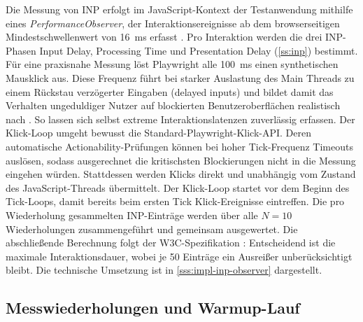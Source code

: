 Die Messung von INP erfolgt im JavaScript-Kontext der Testanwendung mithilfe eines \textit{PerformanceObserver}, der Interaktionsereignisse ab dem browserseitigen Mindestschwellenwert von \qty{16}{ms} erfasst \cite{mocny-event-timing-2026}. Pro Interaktion werden die drei INP-Phasen Input Delay, Processing Time und Presentation Delay (\cref{ss:inp}) bestimmt. Für eine praxisnahe Messung löst Playwright alle \qty{100}{ms} einen synthetischen Mausklick aus. Diese Frequenz führt bei starker Auslastung des Main Threads zu einem Rückstau verzögerter Eingaben (delayed inputs) und bildet damit das Verhalten ungeduldiger Nutzer auf blockierten Benutzeroberflächen realistisch nach \cite{web.dev_inp_2025, mdn_mthread_2025}. So lassen sich selbst extreme Interaktionslatenzen zuverlässig erfassen. Der Klick-Loop umgeht bewusst die Standard-Playwright-Klick-API. Deren automatische Actionability-Prüfungen \cite{playwright-autowaiting} können bei hoher Tick-Frequenz Timeouts auslösen, sodass ausgerechnet die kritischsten Blockierungen nicht in die Messung eingehen würden. Stattdessen werden Klicks direkt und unabhängig vom Zustand des JavaScript-Threads übermittelt. Der Klick-Loop startet vor dem Beginn des Tick-Loops, damit bereits beim ersten Tick Klick-Ereignisse eintreffen. Die pro Wiederholung gesammelten INP-Einträge werden über alle $N = 10$ Wiederholungen zusammengeführt und gemeinsam ausgewertet. Die abschließende Berechnung folgt der W3C-Spezifikation \cite{web.dev_inp_2025, mocny-event-timing-2026}: Entscheidend ist die maximale Interaktionsdauer, wobei je 50 Einträge ein Ausreißer unberücksichtigt bleibt. Die technische Umsetzung ist in \cref{sss:impl-inp-observer} dargestellt.

\subsection{Messwiederholungen und Warmup-Lauf}
\label{ss:statistical-methodology}

